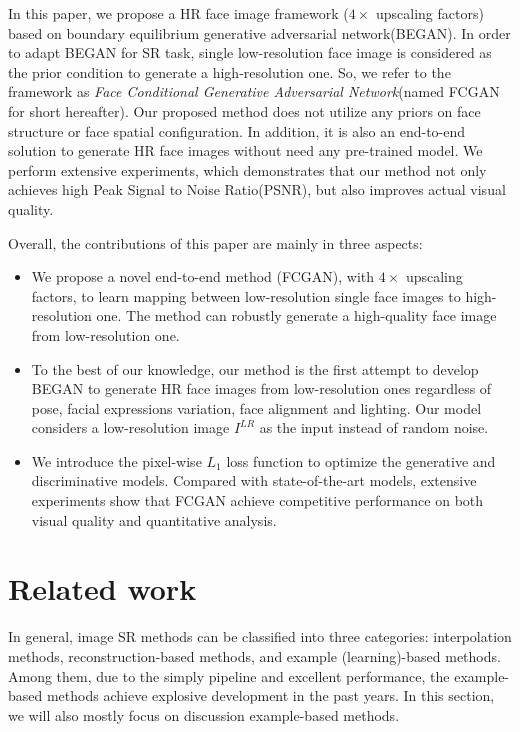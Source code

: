 \documentclass[conference,compsoc]{IEEEtran}
\begin{document}
In this paper, we propose a HR face image framework ($4\times$ upscaling factors) based on boundary equilibrium generative adversarial network(BEGAN)\cite{David-BEGAN2017}. In order to adapt BEGAN for SR task, single low-resolution face image is considered as the prior condition to generate a high-resolution one. So, we refer to the framework as \textit{Face Conditional Generative Adversarial Network}(named FCGAN for short hereafter). Our proposed method does not utilize any priors on face structure or face spatial configuration. In addition, it is also an end-to-end solution to generate HR face images without need any pre-trained model. We perform extensive experiments, which demonstrates that our method not only achieves high Peak Signal to Noise Ratio(PSNR), but also improves actual visual quality.

Overall, the contributions of this paper are mainly in three aspects:

\begin{itemize}
  \item We propose a novel end-to-end method (FCGAN), with $4\times$ upscaling factors, to learn mapping between low-resolution single face images to high-resolution one. The method can robustly generate a high-quality face image from low-resolution one.
  \item To the best of our knowledge, our method is the first attempt to develop BEGAN\cite{David-BEGAN2017} to generate HR face images from low-resolution ones regardless of pose, facial expressions variation, face alignment and lighting. Our model considers a low-resolution image $I^{LR}$ as the input instead of random noise.
  \item We introduce the pixel-wise $L_1$ loss function to optimize the generative and discriminative models. Compared with state-of-the-art models, extensive experiments show that FCGAN achieve competitive performance on both visual quality and quantitative analysis.

\end{itemize}


\section{Related work}

In general, image SR methods can be classified into three categories: interpolation methods, reconstruction-based methods, and example (learning)-based methods. Among them, due to the simply pipeline and excellent performance, the example-based methods\cite{zhu2016deep, Jiang2016Noise-TCYB, jin2015robust, W2016DeepJFHR, Christian-SRGAN-CVPR2017, dong2016accelerating, Dong-He-PAMI2016Image, Jiang2016SRLSP, Kim_2016_DRCN, LapSRN_CVPR2017, Yu-URGAN-ECCV2016} achieve explosive development in the past years. In this section, we will also mostly focus on discussion example-based methods.
\end{document}
